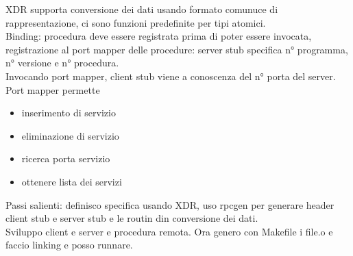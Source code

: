 \documentclass[16px]{article}
\begin{document}
XDR supporta conversione dei dati usando formato comunuce di rappresentazione, ci sono funzioni predefinite per tipi atomici.\\ Binding: procedura deve essere registrata prima di poter essere invocata, registrazione al port mapper delle procedure: server stub specifica n° programma, n° versione e n° procedura.\\ Invocando port mapper, client stub viene a conoscenza del n° porta del server.\\ Port mapper permette
\begin{itemize}
\item inserimento di servizio
\item eliminazione di servizio
\item ricerca porta servizio
\item ottenere lista dei servizi
\end{itemize}
Passi salienti: definisco specifica usando XDR, uso rpcgen per generare header client stub e server stub e le routin din conversione dei dati.\\ Sviluppo client e server e procedura remota. Ora genero con Makefile i file.o e faccio linking e posso runnare.
\end{document}
